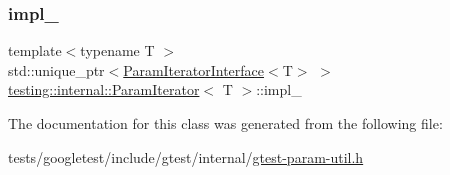 \subsubsection{\texorpdfstring{impl\+\_\+}{impl\_}}
{\footnotesize\ttfamily template$<$typename T $>$ \\
std\+::unique\+\_\+ptr$<$\hyperlink{classtesting_1_1internal_1_1ParamIteratorInterface}{Param\+Iterator\+Interface}$<$T$>$ $>$ \hyperlink{classtesting_1_1internal_1_1ParamIterator}{testing\+::internal\+::\+Param\+Iterator}$<$ T $>$\+::impl\+\_\+\hspace{0.3cm}{\ttfamily [private]}}



The documentation for this class was generated from the following file\+:\begin{DoxyCompactItemize}
\item 
tests/googletest/include/gtest/internal/\hyperlink{gtest-param-util_8h}{gtest-\/param-\/util.\+h}\end{DoxyCompactItemize}
